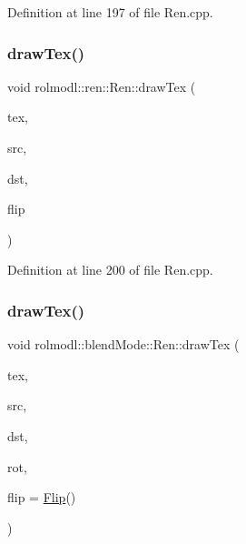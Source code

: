 Definition at line 197 of file Ren.\+cpp.

\mbox{\label{classrolmodl_1_1blend_mode_1_1_ren_a0bf73bb2ff17b6d6f7935de5e2d35b27}} 
\subsubsection{\texorpdfstring{drawTex()}{drawTex()}\hspace{0.1cm}{\footnotesize\ttfamily [28/36]}}
{\footnotesize\ttfamily void rolmodl\+::ren\+::\+Ren\+::draw\+Tex (\begin{DoxyParamCaption}\item[{Tex \&}]{tex,  }\item[{const \mbox{\hyperlink{structrolmodl_1_1blend_mode_1_1_src_rect_x_y}{Src\+Rect\+XY}}}]{src,  }\item[{const \mbox{\hyperlink{structrolmodl_1_1blend_mode_1_1_dst_rect_x_y}{Dst\+Rect\+XY}}}]{dst,  }\item[{const \mbox{\hyperlink{structrolmodl_1_1blend_mode_1_1_flip}{Flip}}}]{flip }\end{DoxyParamCaption})}



Definition at line 200 of file Ren.\+cpp.

\mbox{\label{classrolmodl_1_1blend_mode_1_1_ren_a1dd7a4004d92135390126220eef4e202}} 
\subsubsection{\texorpdfstring{drawTex()}{drawTex()}\hspace{0.1cm}{\footnotesize\ttfamily [29/36]}}
{\footnotesize\ttfamily void rolmodl\+::blend\+Mode\+::\+Ren\+::draw\+Tex (\begin{DoxyParamCaption}\item[{Tex \&}]{tex,  }\item[{const \mbox{\hyperlink{structrolmodl_1_1blend_mode_1_1_src_rect_w_h}{Src\+Rect\+WH}}}]{src,  }\item[{const \mbox{\hyperlink{structrolmodl_1_1blend_mode_1_1_dst_rect_w_h}{Dst\+Rect\+WH}}}]{dst,  }\item[{const double}]{rot,  }\item[{const \mbox{\hyperlink{structrolmodl_1_1blend_mode_1_1_flip}{Flip}}}]{flip = {\ttfamily \mbox{\hyperlink{structrolmodl_1_1blend_mode_1_1_flip}{Flip}}()} }\end{DoxyParamCaption})}

